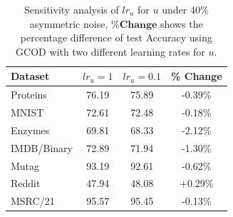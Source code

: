 \begin{table}[htbp]
  \caption{Sensitivity analysis of $lr_u$ for $u$ under 40\% asymmetric noise, $\% \textbf{Change}$ shows the percentage difference of test Accuracy using GCOD with two different learning rates for $u$.}
    \label{tab:lr_sensitivity}
    \centering
    \begin{tabular}{lccc}
        \hline
        \textbf{Dataset} & \textbf{$lr_u=1$} & \textbf{$lr_u=0.1$} & \textbf{\% Change} \\
        \hline
        Proteins    & 76.19 & 75.89 & -0.39\% \\
        MNIST       & 72.61 & 72.48 & -0.18\% \\
        Enzymes     & 69.81 & 68.33 & -2.12\% \\
        IMDB/Binary & 72.89 & 71.94 & -1.30\% \\
        Mutag       & 93.19 & 92.61 & -0.62\% \\
        Reddit      & 47.94 & 48.08 & +0.29\% \\
        MSRC/21     & 95.57 & 95.45 & -0.13\% \\
        \hline
    \end{tabular}

    
\end{table}
